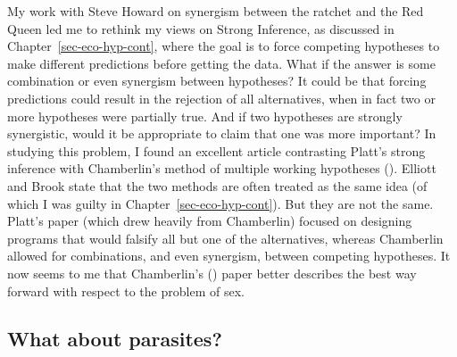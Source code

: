 \documentclass[
  american,
  letterpaper,
]{book}
\begin{document}
My work with Steve Howard on synergism between the ratchet and the Red
Queen led me to rethink my views on Strong Inference, as discussed in
Chapter~\ref{sec-eco-hyp-cont}, where the goal is to force competing
hypotheses to make different predictions before getting the data. What
if the answer is some combination or even synergism between hypotheses?
It could be that forcing predictions could result in the rejection of
all alternatives, when in fact two or more hypotheses were partially
true. And if two hypotheses are strongly synergistic, would it be
appropriate to claim that one was more important? In studying this
problem, I found an excellent article contrasting Platt's strong
inference with Chamberlin's method of multiple working hypotheses
(). Elliott and Brook
state that the two methods are often treated as the same idea (of which
I was guilty in Chapter~\ref{sec-eco-hyp-cont}). But they are not the
same. Platt's paper (which drew heavily from Chamberlin) focused on
designing programs that would falsify all but one of the alternatives,
whereas Chamberlin allowed for combinations, and even synergism, between
competing hypotheses. It now seems to me that Chamberlin's
() paper better describes the best
way forward with respect to the problem of sex.

\subsection{What about parasites?}\label{what-about-parasites}
\end{document}
